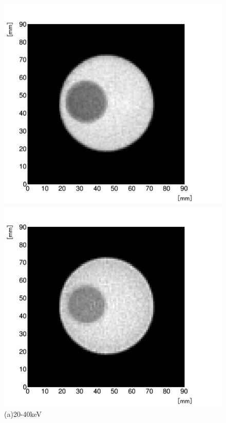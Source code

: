 \begin{figure}[H]
 \begin{minipage}{0.5\hsize}
  \begin{center}
   \includegraphics[bb=0.000000 0.000000 586.511515 539.955364,width=1.0\hsize]{image2/chapter5/low_contrast_20-40.png}
  \end{center}  
\vspace{-1cm}
\caption*{(a)20-40keV}
 \end{minipage}
 \begin{minipage}{0.5\hsize}
  \begin{center}
   \includegraphics[bb=0.000000 0.000000 586.511515 539.955364,width=1.0\hsize]{image2/chapter5/low_contrast_40-60.png}

\end{center}
\end{minipage}
\end{figure}
